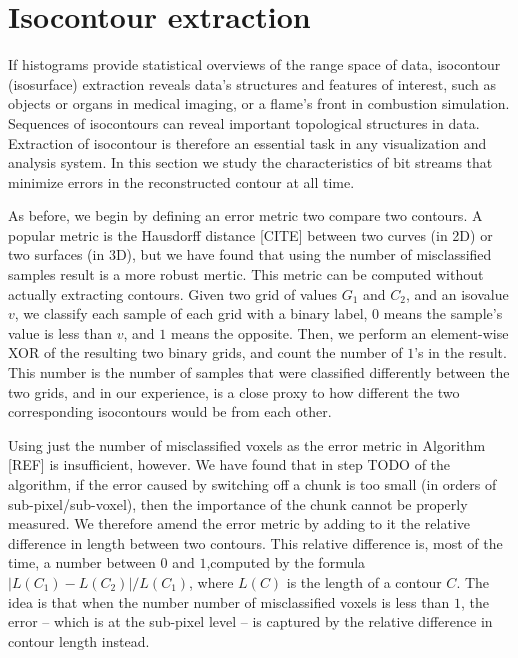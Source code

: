 
\section{Isocontour extraction}
If histograms provide statistical overviews of the range space of data, isocontour (isosurface)
extraction reveals data's structures and features of interest, such as objects or organs in medical
imaging, or a flame's front in combustion simulation. Sequences of isocontours can reveal important
topological structures in data. Extraction of isocontour is therefore an essential task in any
visualization and analysis system. In this section we study the characteristics of bit streams that
minimize errors in the reconstructed contour at all time.

As before, we begin by defining an error metric two compare two contours. A popular metric is the
Hausdorff distance [CITE] between two curves (in 2D) or two surfaces (in 3D), but we have found that
using the number of misclassified samples result is a more robust mertic. This metric can be
computed without actually extracting contours. Given two grid of values $G_1$ and $C_2$, and an
isovalue $v$, we classify each sample of each grid with a binary label, $0$ means the sample's value
is less than $v$, and $1$ means the opposite. Then, we perform an element-wise XOR of the resulting
two binary grids, and count the number of $1$'s in the result. This number is the number of samples
that were classified differently between the two grids, and in our experience, is a close proxy to
how different the two corresponding isocontours would be from each other.

Using just the number of misclassified voxels as the error metric in Algorithm [REF] is
insufficient, however. We have found that in step TODO of the algorithm, if the error caused by
switching off a chunk is too small (in orders of sub-pixel/sub-voxel), then the importance of the
chunk cannot be properly measured. We therefore amend the error metric by adding to it the relative
difference in length between two contours. This relative difference is, most of the time, a number
between $0$ and $1$,computed by the formula $|L(C_1)-L(C_2)|/L(C_1)$, where $L(C)$ is the length of
a contour $C$. The idea is that when the number number of misclassified voxels is less than $1$, the
error -- which is at the sub-pixel level -- is captured by the relative difference in contour length
instead.

